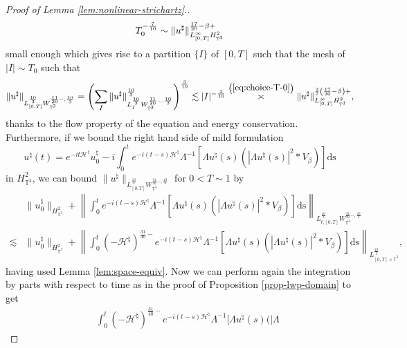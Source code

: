 \begin{proof}[Proof of Lemma \ref{lem:nonlinear-strichartz}.]
\begin{equation}
    T^{- \frac{7}{10}}_0 \sim \| u^{\sharp}
    \|^{{\color[HTML]{000000}\frac{17}{20} - \beta} +}_{L_{[0, T]}^{\infty}
    H_{\mathbb{T}^3}^2} \label{eq:choice-T-0}
  \end{equation}
  small enough which gives rise to a partition $\{ I \}$ of $[0, T]$ such that
  the mesh of $| I | \sim T_0$ such that
  \[ \| u^{\sharp} \|_{L^{\frac{10}{3}}_{[0, T]}
     W_{\mathbb{T}^3}^{\frac{11}{20} -, \frac{10}{3}}} = \left( \sum_I \|
     u^{\sharp} \|^{\frac{10}{3}}_{L_I^{\frac{10}{3}}
     W_{\mathbb{T}^3}^{\frac{11}{20} -, \frac{10}{3}}} \right)^{\frac{3}{10}}
     \lesssim | I |^{- \frac{3}{10}} \overset{\left( \ref{eq:choice-T-0}
     \right)}{\asymp} \| u^{\sharp} \|^{{\color[HTML]{000000}\frac{3}{7}}
     \left( {\color[HTML]{000000}\frac{17}{20} - \beta} \right) +}_{L_{[0,
     T]}^{\infty} H_{\mathbb{T}^3}^2}, \]
  thanks to the flow property of the equation and energy conservation. Furthermore, if we bound the right hand side of mild formulation
  \[ u^{\natural} (t) = e^{- i t \mathcal{H}^{\natural}} u_0^{\natural} - i
     \int^t_0 e^{- i (t - s) \mathcal{H}^{\natural}} \Lambda^{- 1} [\Lambda
     u^{\natural} (s) (| \Lambda u^{\natural} (s) |^2 \ast V_{\beta})]
     \mathrm{ds} \]
  in $H_{\mathbb{T}^3}^2$, we can bound $\| u^{\natural} \|_{L^{\frac{10}{3}}_{[0, T]}
    W_{\mathbb{T}^3}^{\frac{31}{20} -, \frac{10}{3}}}$ for $0 < T \sim 1$ by
  \begin{align*} 
    & \|
    u_0^{\natural} \|_{H_{\mathbb{T}^3}^2} + \left\| \int^t_0 e^{- i (t - s)
    \mathcal{H}^{\natural}} \Lambda^{- 1} [\Lambda u^{\natural} (s) (| \Lambda
    u^{\natural} (s) |^2 \ast V_{\beta})] \mathrm{ds}
    \right\|_{L^{\frac{10}{3}}_{t ; [0, T]} W_{\mathbb{T}^3}^{\frac{31}{20} -,
    \frac{10}{3}}}\\
    \lesssim & \| u_0^{\natural} \|_{H_{\mathbb{T}^3}^2} + \left\| \int^t_0
    (- \mathcal{H}^{\natural})^{\frac{31}{40} -} e^{- i (t - s)
    \mathcal{H}^{\natural}} \Lambda^{- 1} [\Lambda u^{\natural} (s) (| \Lambda
    u^{\natural} (s) |^2 \ast V_{\beta})] \mathrm{ds}
    \right\|_{L^{\frac{10}{3}}_{[0, T] \times \mathbb{T}^3}},
  \end{align*}
  having used Lemma \ref{lem:space-equiv}. Now we can perform again the
  integration by parts with respect to time as in the proof of Proposition
  \ref{prop-lwp-domain} to get
  \begin{eqnarray*}
    &  & \int^t_0 (- \mathcal{H}^{\natural})^{\frac{31}{40} -} e^{- i (t - s)
    \mathcal{H}^{\natural}} \Lambda^{- 1} [\Lambda u^{\natural} (s) (| \Lambda

\end{eqnarray*}
\end{proof}
